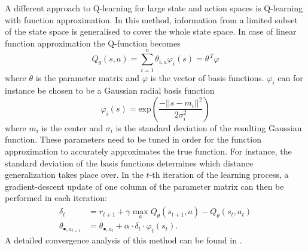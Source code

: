 \documentclass[../main.tex]{subfiles}
\begin{document}
A different approach to Q-learning for large state and action spaces is Q-learning with function approximation. In this method, information from a limited subset of the state space is generalised to cover the whole state space.  In case of linear function approximation the Q-function becomes
\begin{equation}
Q_\theta(s,a) = \sum_{i=1}^n \theta_{i,a}\varphi_i(s) = {\theta}^{\,T} \varphi
\end{equation}
where $\theta$ is the parameter matrix and $\varphi$ is the vector of basis functions. $\varphi_i$ can for instance be chosen to be a Gaussian radial basis function
\begin{equation}
\varphi_i(s) = \text{exp}\left(\dfrac{-||s-m_i||^2}{2\sigma_i^2}\right)
\end{equation}
where $m_i$ is the center and $\sigma_i$ is the standard deviation of the resulting Gaussian function. These parameters need to be tuned in order for the function approximation to accurately approximates the true function. For instance, the standard deviation of the basis functions determines which distance generalization takes place over. In the $t$-th iteration of the learning process, a gradient-descent update of one column of the parameter matrix can then be performed in each iteration:
\begin{align}
\delta_t &= r_{t+1} + \gamma \max_a Q_\theta(s_{t+1},a) - Q_\theta(s_{t},a_t)\\
\theta_{\bullet,a_{t+1}} &= \theta_{\bullet,a_{t}} + \alpha \cdot \delta_t  \cdot \varphi_t(s_t).
\end{align}
A detailed convergence analysis of this method can be found in \cite{tsitsiklis1997analysis}.
\end{document}
